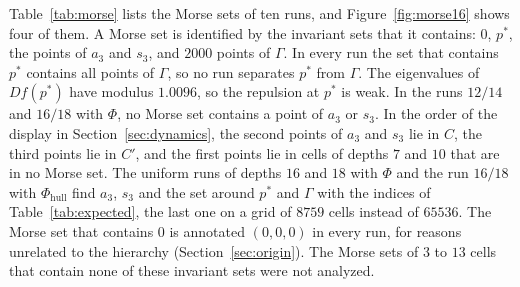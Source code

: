 \documentclass[11pt]{article}
\theoremstyle{plain}
\theoremstyle{definition}
\theoremstyle{remark}
\newcommand{\Phihull}{\Phi_{\mathrm{hull}}}
\begin{document}
Table~\ref{tab:morse} lists the Morse sets of ten runs, and Figure~\ref{fig:morse16} shows four of them. A Morse set is identified by the invariant sets that it contains: $0$, $p^*$, the points of $a_3$ and $s_3$, and $2000$ points of $\Gamma$. In every run the set that contains $p^*$ contains all points of $\Gamma$, so no run separates $p^*$ from $\Gamma$. The eigenvalues of $Df(p^*)$ have modulus $1.0096$, so the repulsion at $p^*$ is weak. In the runs $12/14$ and $16/18$ with $\Phi$, no Morse set contains a point of $a_3$ or $s_3$. In the order of the display in Section~\ref{sec:dynamics}, the second points of $a_3$ and $s_3$ lie in $C$, the third points lie in $C'$, and the first points lie in cells of depths $7$ and $10$ that are in no Morse set. The uniform runs of depths $16$ and $18$ with $\Phi$ and the run $16/18$ with $\Phihull$ find $a_3$, $s_3$ and the set around $p^*$ and $\Gamma$ with the indices of Table~\ref{tab:expected}, the last one on a grid of $8759$ cells instead of $65536$. The Morse set that contains $0$ is annotated $(0,0,0)$ in every run, for reasons unrelated to the hierarchy (Section~\ref{sec:origin}). The Morse sets of $3$ to $13$ cells that contain none of these invariant sets were not analyzed.
\end{document}
